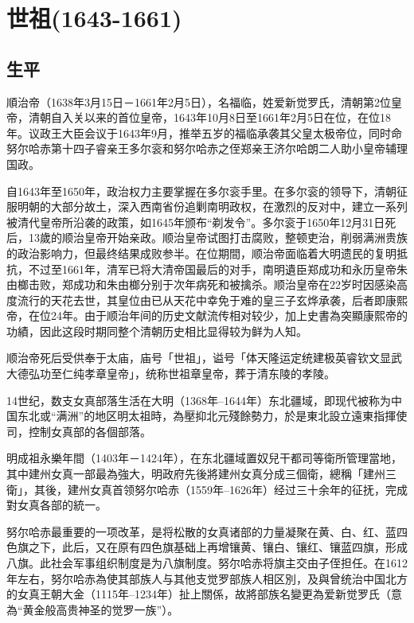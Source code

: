 
\section{世祖\tiny(1643-1661)}

\subsection{生平}

順治帝（1638年3月15日－1661年2月5日），名福临，姓爱新觉罗氏，清朝第2位皇帝，清朝自入关以来的首位皇帝，1643年10月8日至1661年2月5日在位，在位18年。议政王大臣会议于1643年9月，推举五岁的福临承袭其父皇太极帝位，同时命努尔哈赤第十四子睿亲王多尔衮和努尔哈赤之侄郑亲王济尔哈朗二人助小皇帝辅理国政。

自1643年至1650年，政治权力主要掌握在多尔衮手里。在多尔衮的领导下，清朝征服明朝的大部分故土，深入西南省份追剿南明政权，在激烈的反对中，建立一系列被清代皇帝所沿袭的政策，如1645年颁布“剃发令”。多尔衮于1650年12月31日死后，13歲的顺治皇帝开始亲政。顺治皇帝试图打击腐败，整顿吏治，削弱满洲贵族的政治影响力，但最终结果成败参半。在位期間，顺治帝面临着大明遗民的复明抵抗，不过至1661年，清军已将大清帝国最后的对手，南明遺臣郑成功和永历皇帝朱由榔击败，郑成功和朱由榔分别于次年病死和被擒杀。顺治皇帝在22岁时因感染高度流行的天花去世，其皇位由已从天花中幸免于难的皇三子玄烨承袭，后者即康熙帝，在位24年。由于顺治年间的历史文献流传相对较少，加上史書為突顯康熙帝的功績，因此这段时期同整个清朝历史相比显得较为鲜为人知。

顺治帝死后受供奉于太庙，庙号「世祖」，谥号「体天隆运定统建极英睿钦文显武大德弘功至仁纯孝章皇帝」，统称世祖章皇帝，葬于清东陵的孝陵。


14世纪，数支女真部落生活在大明（1368年–1644年）东北疆域，即现代被称为中国东北或“满洲”的地区明太祖時，為壓抑北元殘餘勢力，於是東北設立遠東指揮使司，控制女真部的各個部落。

明成祖永樂年間（1403年－1424年），在东北疆域置奴兒干都司等衛所管理當地，其中建州女真一部最為強大，明政府先後將建州女真分成三個衛，總稱「建州三衛」，其後，建州女真首领努尔哈赤（1559年–1626年）经过三十余年的征抚，完成對女真各部的統一。

努尔哈赤最重要的一项改革，是将松散的女真诸部的力量凝聚在黄、白、红、蓝四色旗之下，此后，又在原有四色旗基础上再增镶黄、镶白、镶红、镶蓝四旗，形成八旗。此社会军事组织制度是为八旗制度。努尔哈赤将旗主交由子侄担任。在1612年左右，努尔哈赤為使其部族人与其他支觉罗部族人相区別，及與曾统治中国北方的女真王朝大金（1115年–1234年）扯上關係，故將部族名變更為爱新觉罗氏（意為“黄金般高贵神圣的觉罗一族”）。

